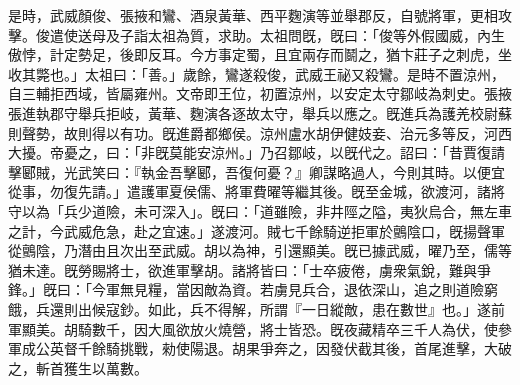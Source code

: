\begin{pinyinscope}
 
是時，武威顏俊、張掖和鸞、酒泉黃華、西平麴演等並舉郡反，自號將軍，更相攻擊。俊遣使送母及子詣太祖為質，求助。太祖問旣，旣曰：「俊等外假國威，內生傲悖，計定勢足，後即反耳。今方事定蜀，且宜兩存而鬬之，猶卞莊子之刺虎，坐收其斃也。」太祖曰：「善。」歲餘，鸞遂殺俊，武威王祕又殺鸞。是時不置涼州，自三輔拒西域，皆屬雍州。文帝即王位，初置涼州，以安定太守鄒岐為刺史。張掖張進執郡守舉兵拒岐，黃華、麴演各逐故太守，舉兵以應之。旣進兵為護羌校尉蘇則聲勢，故則得以有功。旣進爵都鄉侯。涼州盧水胡伊健妓妾、治元多等反，河西大擾。帝憂之，曰：「非旣莫能安涼州。」乃召鄒岐，以旣代之。詔曰：「昔賈復請擊郾賊，光武笑曰：『執金吾擊郾，吾復何憂？』卿謀略過人，今則其時。以便宜從事，勿復先請。」遣護軍夏侯儒、將軍費曜等繼其後。旣至金城，欲渡河，諸將守以為「兵少道險，未可深入」。旣曰：「道雖險，非井陘之隘，夷狄烏合，無左車之計，今武威危急，赴之宜速。」遂渡河。賊七千餘騎逆拒軍於鸇陰口，旣揚聲軍從鸇陰，乃潛由且次出至武威。胡以為神，引還顯美。旣已據武威，曜乃至，儒等猶未達。旣勞賜將士，欲進軍擊胡。諸將皆曰：「士卒疲倦，虜衆氣銳，難與爭鋒。」旣曰：「今軍無見糧，當因敵為資。若虜見兵合，退依深山，追之則道險窮餓，兵還則出候寇鈔。如此，兵不得解，所謂『一日縱敵，患在數世』也。」遂前軍顯美。胡騎數千，因大風欲放火燒營，將士皆恐。旣夜藏精卒三千人為伏，使參軍成公英督千餘騎挑戰，勑使陽退。胡果爭奔之，因發伏截其後，首尾進擊，大破之，斬首獲生以萬數。

\end{pinyinscope}
